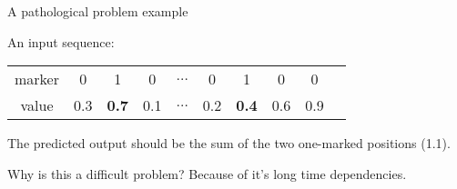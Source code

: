 \begin{frame}{A pathological problem example}


An input sequence:

\vspace{1em}

\begin{tabular}{|c|c|c|c|c|c|c|c|c|c}
	\hline  marker & 0&  1&  0&  $\hdots$& 0 & 1 & 0 & 0  \\ 
	  value & 0.3&  \textbf{0.7}&  0.1&  $\hdots$& 0.2& \textbf{0.4} & 0.6& 0.9  \\ 
	\hline 
\end{tabular}

\vspace{1em}
The predicted output should be the sum of the two one-marked positions (1.1). 
\pause
\vspace{1em}
\begin{block}{Why is this a difficult problem?}
	Because of it's long time dependencies.
\end{block}

\end{frame}

